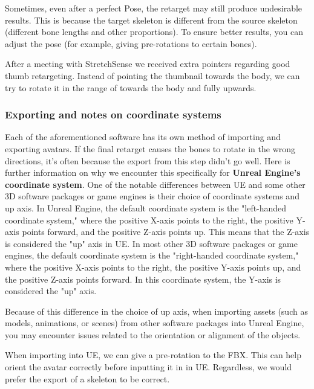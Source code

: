 \documentclass{uva-inf-article}
\begin{document}
Sometimes, even after a perfect Pose, the retarget may still produce undesirable results. This is because the target skeleton is different from the source skeleton (different bone lengths and other proportions). To ensure better results, you can adjust the pose (for example, giving pre-rotations to certain bones).

After a meeting with StretchSense we received extra pointers regarding good thumb retargeting. Instead of pointing the thumbnail towards the body, we can try to rotate it in the range of towards the body and fully upwards.


\subsubsection{Exporting and notes on coordinate systems}
Each of the aforementioned software has its own method of importing and exporting avatars. If the final retarget causes the bones to rotate in the wrong directions, it's often because the export from this step didn't go well. Here is further information on why we encounter this specifically for  \textbf{Unreal Engine's coordinate system}.
One of the notable differences between UE and some other 3D software packages or game engines is their choice of coordinate systems and up axis.
In Unreal Engine, the default coordinate system is the "left-handed coordinate system," where the positive X-axis points to the right, the positive Y-axis points forward, and the positive Z-axis points up. This means that the Z-axis is considered the "up" axis in UE.
In most other 3D software packages or game engines, the default coordinate system is the "right-handed coordinate system," where the positive X-axis points to the right, the positive Y-axis points up, and the positive Z-axis points forward. In this coordinate system, the Y-axis is considered the "up" axis.

Because of this difference in the choice of up axis, when importing assets (such as models, animations, or scenes) from other software packages into Unreal Engine, you may encounter issues related to the orientation or alignment of the objects.

When importing into UE, we can give a pre-rotation to the FBX. This can help orient the avatar correctly before inputting it in in UE.
Regardless, we would prefer the export of a skeleton to be correct.
\end{document}
